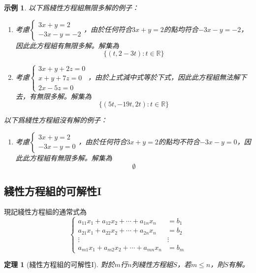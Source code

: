 \documentclass[12pt]{article}
\newtheorem*{theorem}{定理}
\newtheorem*{example}{示例}
\begin{document}
    \begin{example}

        以下爲綫性方程組無限多解的例子：
        \begin{enumerate}
            \item 考慮$\begin{cases}
                3x+y=2\\-3x-y=-2
            \end{cases}$，由於任何符合$3x+y=2$的點均符合$-3x-y=-2$，因此此方程組有無限多解。解集為$$\{(t,2-3t):t\in\mathbb{R}\}$$
            \item 考慮$\begin{cases}
                3x+y+2z=0\\x+y+7z=0\\2x-5z=0
            \end{cases}$，由於上式減中式等於下式，因此此方程組無法解下去，有無限多解。解集為$$\{(5t,-19t,2t):t\in\mathbb{R}\}$$
        \end{enumerate}

        
        以下爲綫性方程組沒有解的例子：\begin{enumerate}
            \item 考慮$\begin{cases}
                3x+y=2\\-3x-y=0
            \end{cases}$，由於任何符合$3x+y=2$的點均不符合$-3x-y=0$，因此此方程組有無限多解。解集為$$\emptyset$$
        \end{enumerate}
    \end{example}

    \subsection*{綫性方程組的可解性I}

    現記綫性方程組的通常式為
    $$\begin{cases}
        a_{11}x_1+a_{12}x_2+\cdots+a_{1n}x_{n}&=b_1\\
        a_{21}x_1+a_{22}x_2+\cdots+a_{2n}x_{n}&=b_2\\
        \vdots&\vdots\\
        a_{m1}x_1+a_{m2}x_2+\cdots+a_{mn}x_{n}&=b_m
    \end{cases}$$
    
    \begin{theorem}[綫性方程組的可解性I]
        對於$m$行$n$列綫性方程組$S$，若$m\leq n$，則$S$有解。
    \end{theorem}
    
\end{document}
